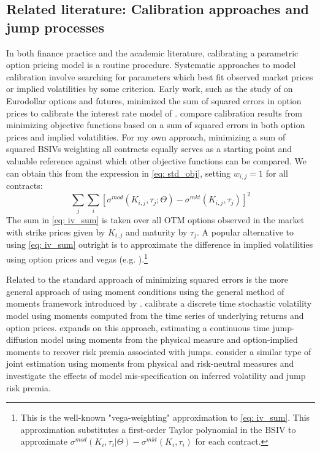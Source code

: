 \documentclass[12pt]{article}
\begin{document}
\subsection{Related literature: Calibration approaches and jump processes}\label{subsec: related_lit}
In both finance practice and the academic literature, calibrating a parametric option pricing model is a routine procedure. Systematic approaches to model calibration involve searching for parameters which best fit observed market prices or implied volatilities by some criterion. Early work, such as the study of \cite{amin1994implied} on Eurodollar options and futures, minimized the sum of squared errors in option prices to calibrate the interest rate model of \cite{heath1992bond}. \cite{bakshi1997empirical} compare calibration results from minimizing objective functions based on a sum of squared errors in both option prices and implied volatilities. For my own approach, minimizing a sum of squared BSIVs weighting all contracts equally serves as a starting point and valuable reference against which other objective functions can be compared. We can obtain this from the expression in \eqref{eq: std_obj}, setting $w_{i,j} = 1$ for all contracts:
\begin{equation}\label{eq: iv_sum}
   \sum\limits_{j} \sum\limits_{i} \left[\sigma^{mod}(K_{i,j}, \tau_j; \Theta) - \sigma^{mkt}(K_{i,j}, \tau_j)\right]^2 
\end{equation}
The sum in \eqref{eq: iv_sum} is taken over all OTM options observed in the market with strike prices given by $K_{i,j}$ and maturity by $\tau_j$. A popular alternative to using \eqref{eq: iv_sum} outright is to approximate the difference in implied volatilities using option prices and \cite{black1973pricing} vegas (e.g. \cite{christoffersen2009shape}).\footnote{This is the well-known "vega-weighting" approximation to \eqref{eq: iv_sum}. This approximation substitutes a first-order Taylor polynomial in the BSIV to approximate $\sigma^{mod}(K_i, \tau_i\vert \Theta) - \sigma^{mkt}(K_i, \tau_i)$ for each contract. } 

Related to the standard approach of minimizing squared errors is the more general approach of using moment conditions using the general method of moments framework introduced by \cite{hansen1982generalized}. \cite{chernov2000study} calibrate a discrete time stochastic volatility model using moments computed from the time series of underlying returns and option prices.  \cite{pan2002jump} expands on this approach, estimating a continuous time jump-diffusion model using moments from the physical measure and option-implied moments to recover risk premia associated with jumps. \cite{broadie2007model} consider a similar type of joint estimation using moments from physical and risk-neutral measures and investigate the effects of model mis-specification on inferred volatility and jump risk premia. 
\end{document}
